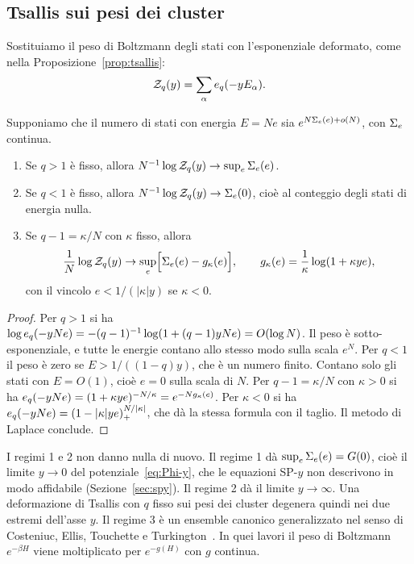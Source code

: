 \subsection{Tsallis sui pesi dei cluster}

Sostituiamo il peso di Boltzmann degli stati con l'esponenziale deformato, come nella Proposizione~\ref{prop:tsallis}:
\begin{equation}
\mathcal Z_q(y)=\sum_\alpha e_q(-yE_\alpha).
\label{eq:Zq}
\end{equation}

\begin{proposizione}
\label{prop:tsallis-regimes}
Supponiamo che il numero di stati con energia $E=Ne$ sia $e^{N\Sigma_e(e)+o(N)}$, con $\Sigma_e$ continua.
\begin{enumerate}
\item Se $q>1$ è fisso, allora $N^{-1}\log\mathcal Z_q(y)\to\sup_e\Sigma_e(e)$.
\item Se $q<1$ è fisso, allora $N^{-1}\log\mathcal Z_q(y)\to\Sigma_e(0)$, cioè al conteggio degli stati di energia nulla.
\item Se $q-1=\kappa/N$ con $\kappa$ fisso, allora
\begin{equation}
\frac1N\log\mathcal Z_q(y)\to\sup_{e}\Bigl[\Sigma_e(e)-g_\kappa(e)\Bigr],\qquad g_\kappa(e)=\frac1\kappa\log(1+\kappa ye),
\label{eq:gen-canonical}
\end{equation}
con il vincolo $e<1/(|\kappa|y)$ se $\kappa<0$.
\end{enumerate}
\end{proposizione}

\begin{proof}
Per $q>1$ si ha $\log e_q(-yNe)=-(q-1)^{-1}\log(1+(q-1)yNe)=O(\log N)$.
Il peso è sotto-esponenziale, e tutte le energie contano allo stesso modo sulla scala $e^{N}$.
Per $q<1$ il peso è zero se $E>1/((1-q)y)$, che è un numero finito.
Contano solo gli stati con $E=O(1)$, cioè $e=0$ sulla scala di $N$.
Per $q-1=\kappa/N$ con $\kappa>0$ si ha $e_q(-yNe)=(1+\kappa ye)^{-N/\kappa}=e^{-Ng_\kappa(e)}$.
Per $\kappa<0$ si ha $e_q(-yNe)=(1-|\kappa|ye)_+^{N/|\kappa|}$, che dà la stessa formula con il taglio.
Il metodo di Laplace conclude.
\end{proof}

I regimi 1 e 2 non danno nulla di nuovo.
Il regime 1 dà $\sup_e\Sigma_e(e)=G(0)$, cioè il limite $y\to0$ del potenziale~\eqref{eq:Phi-y}, che le equazioni SP-$y$ non descrivono in modo affidabile (Sezione~\ref{sec:spy}).
Il regime 2 dà il limite $y\to\infty$.
Una deformazione di Tsallis con $q$ fisso sui pesi dei cluster degenera quindi nei due estremi dell'asse $y$.
Il regime 3 è un ensemble canonico generalizzato nel senso di Costeniuc, Ellis, Touchette e Turkington~\citep{costeniuc2005generalized,costeniuc2006generalized}.
In quei lavori il peso di Boltzmann $e^{-\beta H}$ viene moltiplicato per $e^{-g(H)}$ con $g$ continua.

